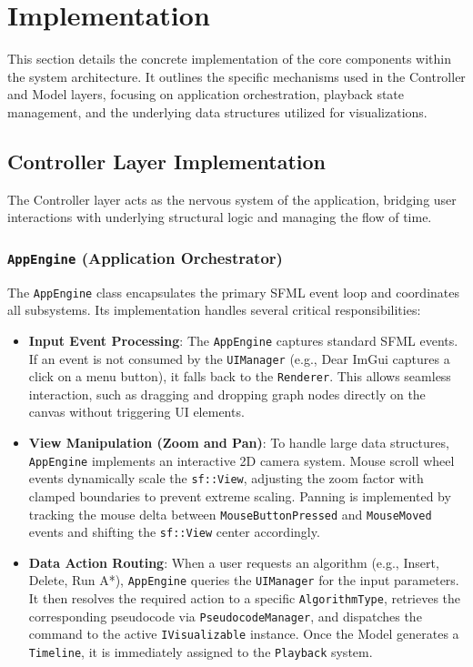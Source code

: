 \section{Implementation}

This section details the concrete implementation of the core components within the system architecture. It outlines the specific mechanisms used in the Controller and Model layers, focusing on application orchestration, playback state management, and the underlying data structures utilized for visualizations.

\subsection{Controller Layer Implementation}

The Controller layer acts as the nervous system of the application, bridging user interactions with underlying structural logic and managing the flow of time.

\subsubsection{\texttt{AppEngine} (Application Orchestrator)}
The \texttt{AppEngine} class encapsulates the primary SFML event loop and coordinates all subsystems. Its implementation handles several critical responsibilities:

\begin{itemize}
    \item \textbf{Input Event Processing}: The \texttt{AppEngine} captures standard SFML events. If an event is not consumed by the \texttt{UIManager} (e.g., Dear ImGui captures a click on a menu button), it falls back to the \texttt{Renderer}. This allows seamless interaction, such as dragging and dropping graph nodes directly on the canvas without triggering UI elements.
    \item \textbf{View Manipulation (Zoom and Pan)}: To handle large data structures, \texttt{AppEngine} implements an interactive 2D camera system. Mouse scroll wheel events dynamically scale the \texttt{sf::View}, adjusting the zoom factor with clamped boundaries to prevent extreme scaling. Panning is implemented by tracking the mouse delta between \texttt{MouseButtonPressed} and \texttt{MouseMoved} events and shifting the \texttt{sf::View} center accordingly.
    \item \textbf{Data Action Routing}: When a user requests an algorithm (e.g., Insert, Delete, Run A*), \texttt{AppEngine} queries the \texttt{UIManager} for the input parameters. It then resolves the required action to a specific \texttt{AlgorithmType}, retrieves the corresponding pseudocode via \texttt{PseudocodeManager}, and dispatches the command to the active \texttt{IVisualizable} instance. Once the Model generates a \texttt{Timeline}, it is immediately assigned to the \texttt{Playback} system.
\end{itemize}


